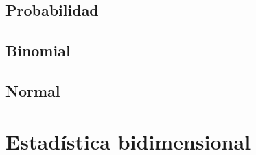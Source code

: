 \subsection{Probabilidad}

\subsection{Binomial}

\subsection{Normal}


\section{Estadística bidimensional}

